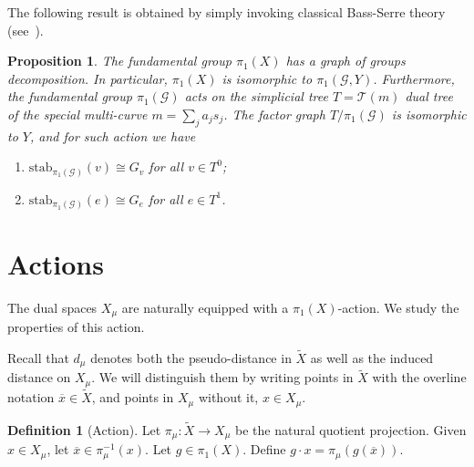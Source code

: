 \documentclass[12pt,article]{amsart}
\numberwithin{equation}{section}
\numberwithin{figure}{section}
\newtheorem{proposition}[equation]{Proposition}
\theoremstyle{definition}
\newtheorem{definition}[equation]{Definition}
\theoremstyle{plain}
\newcommand*{\wt}[1]{\widetilde{#1}}
\begin{document}
The following result is obtained by simply invoking classical Bass-Serre theory (see~\cite{S03:Trees}).

\begin{proposition}
The fundamental group $\pi_1 (X)$ has a graph of groups decomposition. In particular, $\pi_1 (X)$ is isomorphic to $\pi_1 (\mathcal{G},Y)$.
Furthermore, the fundamental group $\pi_1 (\mathcal{G})$ acts on the simplicial tree $T = \mathcal{T} (m)$ dual tree of the special multi-curve $m = \sum_j a_j s_j$. The factor graph $T/\pi_1 (\mathcal{G})$ is isomorphic to $Y$, and for such action we have
\begin{enumerate}
    \item $\mathrm{stab}_{\pi_1 (\mathcal{G})} (v)  \cong G_v$ for all $v \in T ^0$;
    \item $\mathrm{stab}_{\pi_1 (\mathcal{G})} (e) \cong G_e$ for all $e \in T^1$.
\end{enumerate}
\label{prop:graphgroups}
\end{proposition}
\section{Actions}
\label{sec:actions}


The dual spaces $X_{\mu}$ are naturally equipped with a $\pi_1(X)$-action.
We study the properties of this action.

Recall that $d_{\mu}$ denotes both the pseudo-distance in $\wt{X}$ as well as the induced distance on $X_{\mu}$. We will distinguish them by writing points in $\wt{X}$ with the overline notation $\overline{x} \in \wt{X}$, and points in $X_{\mu}$ without it, $x \in X_{\mu}$.


\begin{definition}[Action]
Let $\pi_{\mu} \colon \wt{X} \to X_{\mu}$ be the natural quotient projection. Given $x \in X_{\mu}$, let $\overline{x} \in \pi_{\mu}^{-1}(x)$.
Let $g \in \pi_1(X)$. Define $g \cdot x = \pi_{\mu} ( g(\overline{x}))$.
\label{def:action}
\end{definition}
\end{document}
